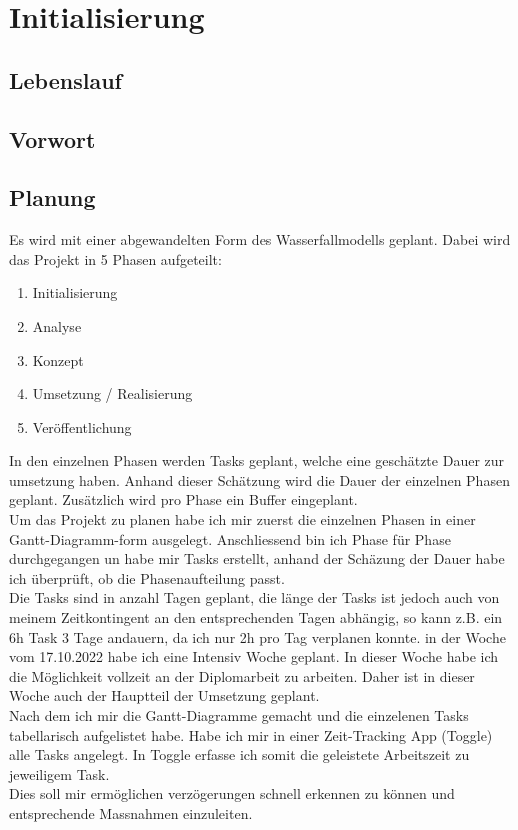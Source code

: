 \section{Initialisierung}
\newpage
\subsection{Lebenslauf}
\newpage
\subsection{Vorwort}
\newpage
\subsection{Planung}

Es wird mit einer abgewandelten Form des Wasserfallmodells geplant.
Dabei wird das Projekt in 5 Phasen aufgeteilt: \\
\begin{enumerate}
  \item Initialisierung
  \item Analyse
  \item Konzept
  \item Umsetzung / Realisierung
  \item Veröffentlichung
\end{enumerate}

In den einzelnen Phasen werden Tasks geplant, welche eine geschätzte Dauer zur umsetzung haben.
Anhand dieser Schätzung wird die Dauer der einzelnen Phasen geplant. Zusätzlich wird pro Phase ein Buffer eingeplant.\\
\space
Um das Projekt zu planen habe ich mir zuerst die einzelnen Phasen in einer Gantt-Diagramm-form ausgelegt.
Anschliessend bin ich Phase für Phase durchgegangen un habe mir Tasks erstellt, anhand der Schäzung der Dauer habe ich überprüft,
ob die Phasenaufteilung passt.\\
Die Tasks sind in anzahl Tagen geplant, die länge der Tasks ist jedoch auch von meinem Zeitkontingent an den entsprechenden Tagen abhängig,
so kann z.B. ein 6h Task 3 Tage andauern, da ich nur 2h pro Tag verplanen konnte.
in der Woche vom 17.10.2022 habe ich eine Intensiv Woche geplant. In dieser Woche habe ich die Möglichkeit vollzeit an der Diplomarbeit zu arbeiten.
Daher ist in dieser Woche auch der Hauptteil der Umsetzung geplant.\\
Nach dem ich mir die Gantt-Diagramme gemacht und die einzelenen Tasks tabellarisch aufgelistet habe. 
Habe ich mir in einer Zeit-Tracking App (Toggle) alle Tasks angelegt. In Toggle erfasse ich somit die geleistete Arbeitszeit zu jeweiligem Task.\\
Dies soll mir ermöglichen verzögerungen schnell erkennen zu können und entsprechende Massnahmen einzuleiten.

